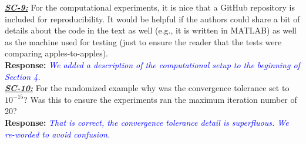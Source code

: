 \documentclass{article}
\newcommand{\response}[1]{\textbf{Response:} \textcolor{blue}{\textit{#1}}\\}
\begin{document}
\noindent \ul{\textit{\textbf{SC-9:}}} For the computational experiments, it is nice that a GitHub repository is included for reproducibility. It would be helpful if the authors could share a bit of details about the code in the text as well (e.g., it is written in MATLAB) as well as the machine used for testing (just to ensure the reader that the tests were comparing apples-to-apples).\\

\response{We added a description of the computational setup to the beginning of Section 4.}

\noindent \ul{\textit{\textbf{SC-10:}}} For the randomized example why was the convergence tolerance set to $10^{-15}$? Was this to ensure the experiments ran the maximum iteration number of 20?\\

\response{That is correct, the convergence tolerance detail is superfluous.  We re-worded to avoid confusion.}




\end{document}
